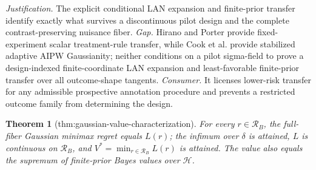 \documentclass{article}
\newtheorem{theorem}{Theorem}
\begin{document}
\par\smallskip\noindent \textit{Justification.} The explicit conditional LAN expansion and finite-prior transfer identify exactly what survives a discontinuous pilot design and the complete contrast-preserving nuisance fiber. \textit{Gap.} Hirano and Porter provide fixed-experiment scalar treatment-rule transfer, while Cook et al. provide stabilized adaptive AIPW Gaussianity; neither conditions on a pilot sigma-field to prove a design-indexed finite-coordinate LAN expansion and least-favorable finite-prior transfer over all outcome-shape tangents. \textit{Consumer.} It licenses lower-risk transfer for any admissible prospective annotation procedure and prevents a restricted outcome family from determining the design.

\begin{theorem}[thm:gaussian-value-characterization]\label{thm:gaussian-value-characterization}
For every \(r\in\mathcal R_B\), the full-fiber Gaussian minimax regret equals \(L(r)\); the infimum over \(\delta\) is attained, \(L\) is continuous on \(\mathcal R_B\), and \(V^*=\min_{r\in\mathcal R_B}L(r)\) is attained. The value also equals the supremum of finite-prior Bayes values over \(\mathcal H\).
\end{theorem}
\end{document}
